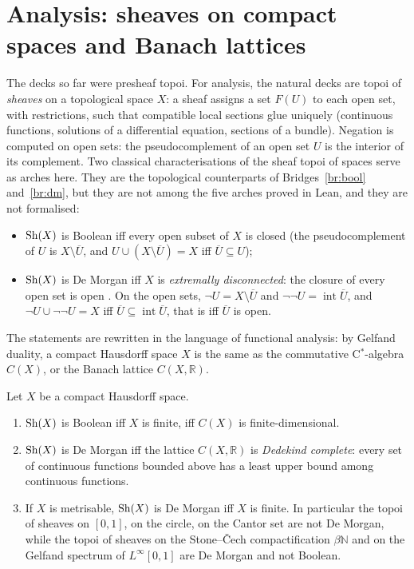 \section{Analysis: sheaves on compact spaces and Banach lattices}\label{sec:analysis}

The decks so far were presheaf topoi. For analysis, the natural decks are topoi of \emph{sheaves} on a topological space $X$: a sheaf assigns a set $F(U)$ to each open set, with restrictions, such that compatible local sections glue uniquely (continuous functions, solutions of a differential equation, sections of a bundle). Negation is computed on open sets: the pseudocomplement of an open set $U$ is the interior of its complement. Two classical characterisations of the sheaf topoi of spaces serve as arches here. They are the topological counterparts of Bridges~\ref{br:bool} and~\ref{br:dm}, but they are not among the five arches proved in Lean, and they are not formalised:
\begin{itemize}
\item $\mathrm{Sh}(X)$ is Boolean iff every open subset of $X$ is closed (the pseudocomplement of $U$ is $X\setminus\overline U$, and $U\cup(X\setminus\overline U) = X$ iff $\overline U\subseteq U$);
\item $\mathrm{Sh}(X)$ is De Morgan iff $X$ is \emph{extremally disconnected}: the closure of every open set is open \cite{johnstone-demorgan}. On the open sets, $\neg U = X\setminus\overline U$ and $\neg\neg U = \operatorname{int}\overline U$, and $\neg U\cup\neg\neg U = X$ iff $\overline U\subseteq\operatorname{int}\overline U$, that is iff $\overline U$ is open.
\end{itemize}
The statements are rewritten in the language of functional analysis: by Gelfand duality, a compact Hausdorff space $X$ is the same as the commutative C$^*$-algebra $C(X)$, or the Banach lattice $C(X,\mathbb R)$.

\begin{theorem}\label{th:analysis}
Let $X$ be a compact Hausdorff space.
\begin{enumerate}
\item $\mathrm{Sh}(X)$ is Boolean iff $X$ is finite, iff $C(X)$ is finite-dimensional.
\item $\mathrm{Sh}(X)$ is De Morgan iff the lattice $C(X,\mathbb R)$ is \emph{Dedekind complete}: every set of continuous functions bounded above has a least upper bound among continuous functions.
\item If $X$ is metrisable, $\mathrm{Sh}(X)$ is De Morgan iff $X$ is finite. In particular the topoi of sheaves on $[0,1]$, on the circle, on the Cantor set are not De Morgan, while the topoi of sheaves on the Stone--Čech compactification $\beta\mathbb N$ and on the Gelfand spectrum of $L^\infty[0,1]$ are De Morgan and not Boolean.
\end{enumerate}
\end{theorem}

